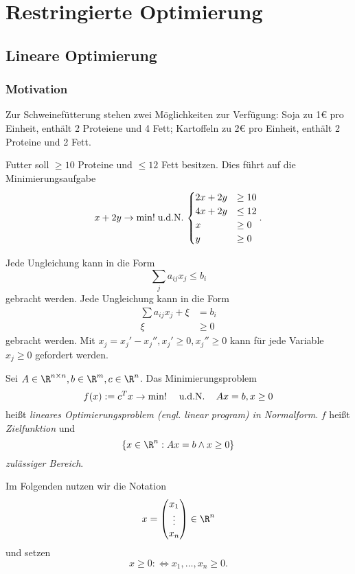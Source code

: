 \chapter{Restringierte Optimierung}



\section{Lineare Optimierung}


\subsection{Motivation}

Zur Schweinefütterung stehen zwei Möglichkeiten zur Verfügung:
 Soja zu 1€ pro Einheit, enthält 2 Proteiene und 4 Fett; Kartoffeln zu 2€ pro Einheit, enthält 2 Proteine und 2 Fett.

Futter soll $\ge 10$ Proteine und $\le 12$ Fett besitzen.
Dies führt auf die Minimierungsaufgabe
\[
	x + 2y \to \min!
	\;\text{u.d.N.}\,
	\begin{cases}
		2x + 2y &\ge 10 \\
		4x + 2y &\le 12 \\
		x &\ge 0 \\
		y &\ge 0
	\end{cases}.
\]


Jede Ungleichung kann in die Form
\[
	\sum_{j} a_{ij} x_j \le b_i
\]
gebracht werden.
Jede Ungleichung kann in die Form
\begin{align*}
	\sum a_{ij} x_j + \xi &= b_i \\
	\xi &\ge 0
\end{align*}
gebracht werden.
Mit $x_j = x_j' - x_j'', x_j' \ge 0, x_j'' \ge 0$
kann für jede Variable $x_j \ge 0$ gefordert werden.

\begin{df} \label{3.1}
	Sei $A \in \R^{n\times n}, b\in \R^m, c \in \R^n$.
	Das Minimierungsproblem
	\[
		f(x) := c^T x \to \min!
		\quad\;\text{u.d.N.}\,\quad
		Ax = b, x \ge 0
	\]
	heißt \emph{lineares Optimierungsproblem (engl. linear program) in Normalform}.
	$f$ heißt \emph{Zielfunktion} und
	\[
		\{x \in \R^n : Ax = b \land x \ge 0 \}
	\]
	\emph{zulässiger Bereich}.
\end{df}

\begin{conv*}
	Im Folgenden nutzen wir die Notation
	\[
		x = \begin{pmatrix}
			x_1 \\ \vdots \\ x_n
		\end{pmatrix} \in \R^n
	\]
	und setzen
	\[
		x \ge 0
		:\iff
		x_1, \dotsc, x_n \ge 0.
	\]
\end{conv*}

